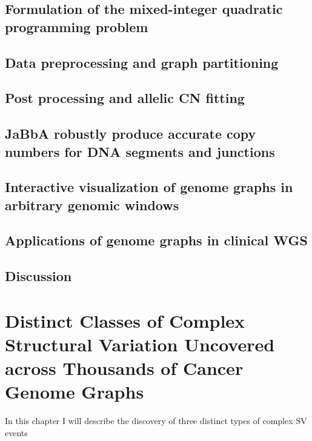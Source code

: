 \documentclass[phd,tocprelim]{cornell}
\begin{document}
\section{Formulation of the mixed-integer quadratic programming problem}


\section{Data preprocessing and graph partitioning}


\section{Post processing and allelic CN fitting}

\section{JaBbA robustly produce accurate copy numbers for DNA segments and junctions}

\section{Interactive visualization of genome graphs in arbitrary genomic windows}

\section{Applications of genome graphs in clinical WGS}

\section{Discussion}

\chapter{Distinct Classes of Complex Structural Variation Uncovered across Thousands of Cancer Genome Graphs}
In this chapter I will describe the discovery of three distinct types of complex SV events 
\end{document}
